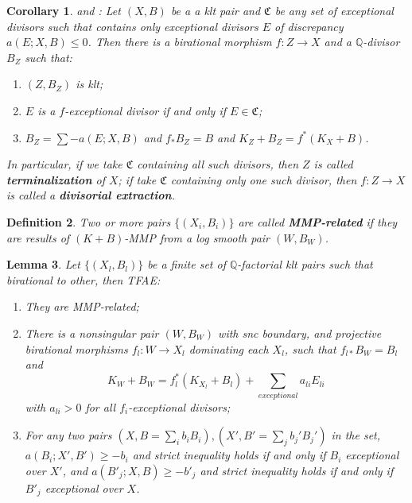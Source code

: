 \documentclass{article}
\newtheorem{defn}{Definition}[subsection]
\newtheorem{lem}[defn]{Lemma}
\newtheorem{cor}[defn]{Corollary}
\newtheorem{rmk}[defn]{Remark}
\begin{document}
\begin{cor}\label{extraction}
  \cite[Corollary 13.7]{haconMinimalModelProgram2012} and \cite[Corollary 1.4.3]{birkarExistenceMinimalModels2009}: Let $ (X,B) $ be a a klt pair and $\mathfrak{C}$ be any set of exceptional divisors such that  contains only exceptional divisors $ E $ of discrepancy $ a(E;X,B)\leqslant 0 $. Then there is a birational morphism $ f:Z\to X $ and a $ \mathbb{Q} $-divisor $ B_Z $ such that:
  \begin{enumerate}
    \item $ (Z,B_Z) $ is klt;
    \item $ E $ is a $f$-exceptional divisor if and only if $ E\in \mathfrak{C} $;
    \item $ B_Z=\sum-a(E;X,B) $ and $ f_*B_Z=B $ and $ K_Z+B_Z=f^*(K_X+B) $.
  \end{enumerate} 
  In particular, if we take $\mathfrak{C}$ containing all such divisors, then $ Z $ is called \textbf{terminalization} of $ X $; if take $\mathfrak{C}$ containing only one such divisor, then $ f:Z\to X $ is called a \textbf{divisorial extraction}.    
\end{cor}

\begin{defn}
  \cite[Definition 3.3]{brunoLogSarkisovProgram1995}
  Two or more pairs $ \{(X_i,B_i)\} $ are called \textbf{MMP-related} if they are results of $ (K+B) $-MMP from a log smooth pair $(W,B_{W})$.
\end{defn}
  
 \begin{lem}\label{MMPrelatedConditation}
  \cite[Proposition 3.4]{brunoLogSarkisovProgram1995}
  Let $ \{(X_l,B_l)\} $ be a finite set of $ \mathbb{Q} $-factorial klt pairs such that birational to other, then TFAE:
  \begin{enumerate}
    \item They are MMP-related;
    \item There is a nonsingular pair $ (W,B_W) $ with snc boundary, and projective birational morphisms $ f_l:W\to  X_l $ dominating each $ X_l $, such that $ f_{l*}B_W=B_l $ and
      \[ K_W+B_W=f_l^*(K_{X_l}+B_l)+\sum_{exceptional}{a_{li}E_{li}} \]
      with $ a_{li}>0 $ for all $ f_i $-exceptional divisors;
    \item For any two pairs $ (X,B=\sum_ib_iB_i),(X',B'=\sum _jb_j'B_j') $ in the set,  $ a(B_i;X',B')\geqslant -b_i $ and strict inequality holds if and only if $ B_i $ exceptional over $ X' $, and $ a(B'_j;X,B)\geqslant -b'_j $ and strict inequality holds if and only if $ B'_j $ exceptional over $ X $.
  \end{enumerate}
\end{lem}
\end{document}
